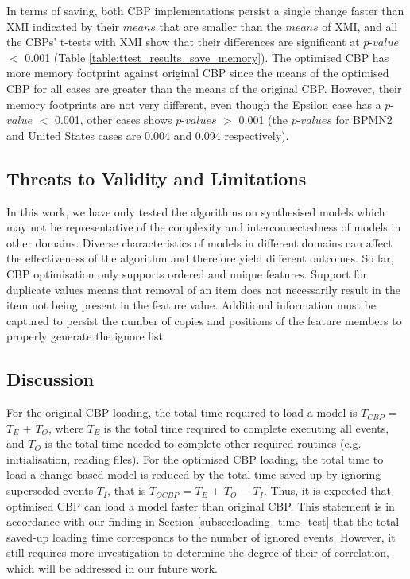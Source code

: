 \documentclass{llncs}
\begin{document}
{    In terms of saving, both CBP implementations persist a single change faster than XMI indicated by their $means$ that are smaller than the $means$ of XMI, and all the CBPs' t-tests with XMI show that their differences are significant at $p$-$value$ $<$ 0.001 (Table \ref{table:ttest_results_save_memory}). The optimised CBP has more memory footprint against original CBP since the means of the optimised CBP for all cases are greater than the means of the original CBP. However, their memory footprints are not very different, even though the Epsilon case has a $p$-$value$ $<$ 0.001, other cases shows $p$-$values$ $>$ 0.001 (the $p$-$values$ for BPMN2 and United States cases are 0.004 and 0.094 respectively).   
   
    \vspace{-15pt}
    \subsection{Threats to Validity and Limitations}
    \label{sec:limitations_and_future_work}
    
    \vspace{-10pt}
    In this work, we have only tested the algorithms on synthesised  models which may not be representative of the complexity and interconnectedness of models in other domains. Diverse characteristics of models in different domains can affect the effectiveness of the algorithm and therefore yield different outcomes. So far, CBP optimisation only supports ordered and unique features. Support for duplicate values means that removal of an item does not necessarily result in the item not being present in the feature value. Additional information must be captured to persist the number of copies and positions of the feature members to properly generate the ignore list. 
    
    \vspace{-15pt}
     \subsection{Discussion}
    \label{sec:discussion}
    
    \vspace{-10pt}
    For the original CBP loading, the total time required to load a model is $T_{CBP}$ = $T_E$ + $T_O$, where $T_E$ is the total time required to complete executing all events, and $T_O$ is the total time needed to complete other required routines (e.g. initialisation, reading files). For the optimised CBP loading, the total time to load a change-based model is reduced by the total time saved-up by ignoring superseded events $T_I$, that is $T_{OCBP}$ = $T_E$ + $T_O$ $-$ $T_I$. Thus, it is expected that optimised CBP can load a model faster than original CBP. This statement is in accordance with our finding in Section \ref{subsec:loading_time_test} that the total saved-up loading time corresponds to the number of ignored events. However, it still requires more investigation to determine the degree of their of correlation, which will be addressed in our future work.
    
}
\end{document}
